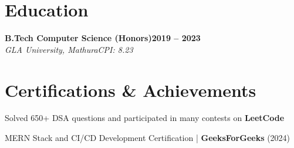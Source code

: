 \documentclass[letterpaper, 10pt]{article}
\newcommand{\heading}[2]{ \hspace{5pt}#1\hfill#2\\[1pt] }
\newcommand{\headingBf}[2]{ \heading{\textbf{#1}}{\textbf{#2}} }
\newcommand{\headingIt}[2]{ \heading{\textit{#1}}{\textit{#2}} }
\newenvironment{resume_list}{
\vspace{-3pt}
\begin{itemize}[itemsep=0.5pt, parsep=0.5pt, leftmargin=18pt] }{ \end{itemize}
\vspace{-3pt}
}
\begin{document}
\section{Education}
\headingBf{B.Tech Computer Science (Honors)}{2019 -- 2023}
\headingIt{GLA University, Mathura}{CPI: 8.23}

\section{Certifications \& Achievements}
\begin{resume_list}
    \item Solved 650+ DSA questions and participated in many contests on \textbf{LeetCode} \href{https://leetcode.com/u/KeshariPiyush24/}{\faLink}
    \item MERN Stack and CI/CD Development Certification | \textbf{GeeksForGeeks} (2024) \href{https://media.geeksforgeeks.org/certificates/1706532819/013b39c1dda8d49bf888496b0d0d6b1b.pdf}{\faLink}
\end{resume_list}
\end{document}
